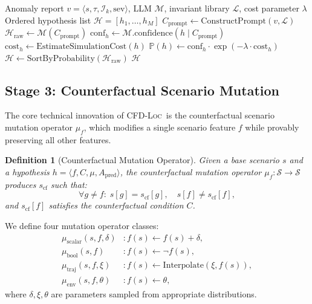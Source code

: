 \documentclass[journal]{IEEEtran}
\theoremstyle{plain}
\newtheorem{definition}{Definition}[section]
\theoremstyle{definition}
\theoremstyle{remark}
\newcommand{\methodname}{\textsc{CFD-Loc}}
\newcommand{\invlib}{\mathcal{L}}
\newcommand{\scenario}{\mathcal{S}}
\newcommand{\Prob}{\mathbb{P}}
\begin{document}
\begin{algorithm}[t]
\caption{Bayesian Hypothesis Selection}
\label{alg:hypothesis}
\begin{algorithmic}[1]
\Require Anomaly report $v = \langle s,\tau,\mathcal{I}_k,\text{sev} \rangle$, LLM $\mathcal{M}$, invariant library $\invlib$, cost parameter $\lambda$
\Ensure Ordered hypothesis list $\mathcal{H} = [h_1,\dots,h_M]$
\State $C_{\text{prompt}} \gets \text{ConstructPrompt}(v, \invlib)$
\State $\mathcal{H}_{\text{raw}} \gets \mathcal{M}(C_{\text{prompt}})$ 
    \State $\text{conf}_h \gets \mathcal{M}.\text{confidence}(h \mid C_{\text{prompt}})$
    \State $\text{cost}_h \gets \text{EstimateSimulationCost}(h)$
    \State $\Prob(h) \gets \text{conf}_h \cdot \exp(-\lambda \cdot \text{cost}_h)$
\EndFor
\State $\mathcal{H} \gets \text{SortByProbability}(\mathcal{H}_{\text{raw}})$
\State \Return $\mathcal{H}$
\end{algorithmic}
\end{algorithm}

\subsection{Stage 3: Counterfactual Scenario Mutation}
\label{sec:mutation}

The core technical innovation of \methodname\ is the counterfactual scenario mutation operator $\mu_f$, which modifies a single scenario feature $f$ while provably preserving all other features.

\begin{definition}[Counterfactual Mutation Operator]\label{def:mutation}
Given a base scenario $s$ and a hypothesis $h = \langle f, C, \mu, A_{\text{pred}} \rangle$, the counterfactual mutation operator $\mu_f: \scenario \to \scenario$ produces $s_{\text{cf}}$ such that:
\begin{equation}
\forall g \neq f: \; s[g] = s_{\text{cf}}[g], \quad s[f] \neq s_{\text{cf}}[f],
\label{eq:isolation}
\end{equation}
and $s_{\text{cf}}[f]$ satisfies the counterfactual condition $C$.
\end{definition}

We define four mutation operator classes:
\begin{align}
\mu_{\text{scalar}}(s,f,\delta) &: f(s) \leftarrow f(s) + \delta, \label{eq:mu_scalar} \\
\mu_{\text{bool}}(s,f) &: f(s) \leftarrow \neg f(s), \label{eq:mu_bool} \\
\mu_{\text{traj}}(s,f,\xi) &: f(s) \leftarrow \text{Interpolate}(\xi, f(s)), \label{eq:mu_traj} \\
\mu_{\text{env}}(s,f,\theta) &: f(s) \leftarrow \theta, \label{eq:mu_env}
\end{align}
where $\delta, \xi, \theta$ are parameters sampled from appropriate distributions.
\end{document}
